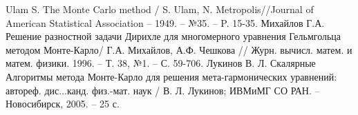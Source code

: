 \newpage
\begin{thebibliography}{99} 
		 Ulam S. The Monte Carlo method / S. Ulam, N. Metropolis//Journal of American Statistical Association -- 1949. -- №35. -- P. 15-35.
	Михайлов Г.А. Решение разностной задачи Дирихле для многомерного уравнения Гельмгольца методом Монте-Карло/ Г.А. Михайлов, А.Ф. Чешкова  // Журн. вычисл. матем. и матем. физики.  1996. -- Т. 38,  №1. -- С. 59-706.
	 Лукинов В. Л. Скалярные Алгоритмы метода Монте-Карло для решения мета-гармонических уравнений: автореф. дис...канд. физ.-мат. наук / В. Л. Лукинов; ИВМиМГ СО РАН. -- Новосибирск, 2005. -- 25 с.
\end{thebibliography}
